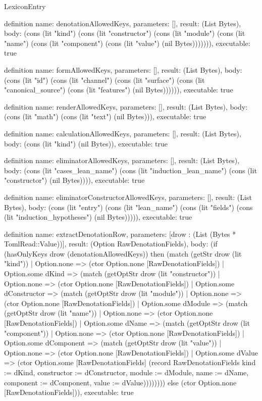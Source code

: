 \begin{lexlean}{LexiconEntry}
\begin{semanticmodule}
definition{
  name: denotationAllowedKeys,
  parameters: [],
  result: (List Bytes),
  body: (cons (lit "kind") (cons (lit "constructor") (cons (lit "module") (cons (lit "name") (cons (lit "component") (cons (lit "value") (nil Bytes))))))),
  executable: true
}

definition{
  name: formAllowedKeys,
  parameters: [],
  result: (List Bytes),
  body: (cons (lit "id") (cons (lit "channel") (cons (lit "surface") (cons (lit "canonical_source") (cons (lit "features") (nil Bytes)))))),
  executable: true
}

definition{
  name: renderAllowedKeys,
  parameters: [],
  result: (List Bytes),
  body: (cons (lit "math") (cons (lit "text") (nil Bytes))),
  executable: true
}

definition{
  name: calculationAllowedKeys,
  parameters: [],
  result: (List Bytes),
  body: (cons (lit "kind") (nil Bytes)),
  executable: true
}

definition{
  name: eliminatorAllowedKeys,
  parameters: [],
  result: (List Bytes),
  body: (cons (lit "cases_lean_name") (cons (lit "induction_lean_name") (cons (lit "constructor") (nil Bytes)))),
  executable: true
}

definition{
  name: eliminatorConstructorAllowedKeys,
  parameters: [],
  result: (List Bytes),
  body: (cons (lit "entry") (cons (lit "lean_name") (cons (lit "fields") (cons (lit "induction_hypotheses") (nil Bytes))))),
  executable: true
}

definition{
  name: extractDenotationRow,
  parameters: [drow : (List (Bytes * TomlRead::Value))],
  result: (Option RawDenotationFields),
  body: (if (hasOnlyKeys drow (denotationAllowedKeys)) then (match (getStr drow (lit "kind"))
    | Option.none => (ctor Option.none [RawDenotationFields])
    | Option.some dKind => (match (getOptStr drow (lit "constructor"))
      | Option.none => (ctor Option.none [RawDenotationFields])
      | Option.some dConstructor => (match (getOptStr drow (lit "module"))
        | Option.none => (ctor Option.none [RawDenotationFields])
        | Option.some dModule => (match (getOptStr drow (lit "name"))
          | Option.none => (ctor Option.none [RawDenotationFields])
          | Option.some dName => (match (getOptStr drow (lit "component"))
            | Option.none => (ctor Option.none [RawDenotationFields])
            | Option.some dComponent => (match (getOptStr drow (lit "value"))
              | Option.none => (ctor Option.none [RawDenotationFields])
              | Option.some dValue => (ctor Option.some [RawDenotationFields] (record RawDenotationFields {kind := dKind, constructor := dConstructor, module := dModule, name := dName, component := dComponent, value := dValue})))))))) else (ctor Option.none [RawDenotationFields])),
  executable: true
}


\end{semanticmodule}
\end{lexlean}
